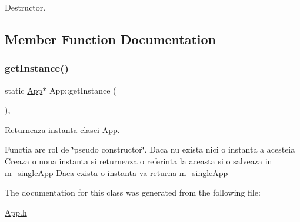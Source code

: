 Destructor. 



\subsection{Member Function Documentation}
\mbox{\label{class_app_a7e99b27b00ad6643bb09a7a43f579ba0}} 
\subsubsection{\texorpdfstring{get\+Instance()}{getInstance()}}
{\footnotesize\ttfamily static \hyperlink{class_app}{App}$\ast$ App\+::get\+Instance (\begin{DoxyParamCaption}{ }\end{DoxyParamCaption})\hspace{0.3cm}{\ttfamily [inline]}, {\ttfamily [static]}}



Returneaza instanta clasei \hyperlink{class_app}{App}. 

Functia are rol de \char`\"{}pseudo constructor\char`\"{}. Daca nu exista nici o instanta a acesteia Creaza o noua instanta si returneaza o referinta la aceasta si o salveaza in m\+\_\+single\+App Daca exista o instanta va returna m\+\_\+single\+App 

The documentation for this class was generated from the following file\+:\begin{DoxyCompactItemize}
\item 
\hyperlink{_app_8h}{App.\+h}\end{DoxyCompactItemize}
